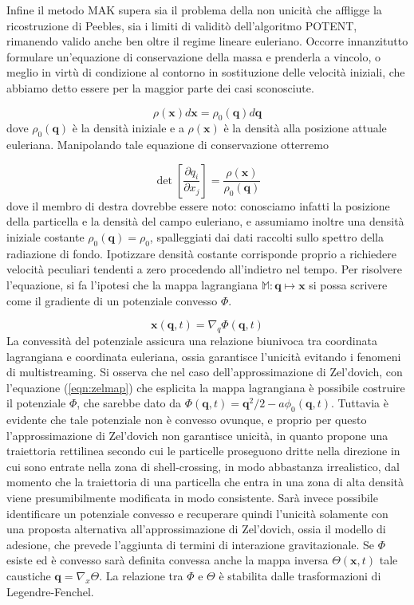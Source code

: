 Infine il metodo MAK supera sia il problema della non unicità che affligge la ricostruzione di Peebles, 
sia i limiti di validitò dell'algoritmo POTENT, rimanendo valido anche ben oltre il regime lineare euleriano.
Occorre innanzitutto formulare un'equazione di conservazione della massa e prenderla a vincolo, o meglio in virtù
di condizione al contorno in sostituzione delle velocità iniziali, che abbiamo detto essere per la maggior parte dei
casi sconosciute.

\begin{equation}
    \rho(\bm{x})d\bm{x} = \rho_0(\bm{q})d\bm{q}
\end{equation}
dove $\rho_0(\bm{q})$ è la densità iniziale e a $\rho(\bm{x})$ è la densità alla posizione attuale euleriana.
Manipolando tale equazione di conservazione otterremo 

\begin{equation}
    \label{eqn:masscons}
    \det\left[\frac{\partial q_i}{\partial x_j}\right] = \frac{\rho(\bm{x})}{\rho_0(\bm{q})}
\end{equation}
dove il membro di destra dovrebbe essere noto: conosciamo infatti la posizione della particella
e la densità del campo euleriano, e assumiamo inoltre una densità iniziale costante $\rho_0(\bm{q}) = \rho_0$,
spalleggiati dai dati raccolti sullo spettro della radiazione di fondo. Ipotizzare densità costante corrisponde 
proprio a richiedere velocità peculiari tendenti a zero procedendo all'indietro nel tempo.
Per risolvere l'equazione, si fa l'ipotesi che la mappa lagrangiana $\mathbb{M}: \bm{q} \mapsto \bm{x}$ si 
possa scrivere come il gradiente di un potenziale convesso $\Phi$.

\begin{equation}
    \bm{x}(\bm{q}, t) = \nabla_q \Phi(\bm{q}, t)
\end{equation}
La convessità del potenziale assicura una relazione biunivoca tra coordinata lagrangiana e coordinata
euleriana, ossia garantisce l'unicità evitando i fenomeni di multistreaming.
Si osserva che nel caso dell'approssimazione di Zel'dovich, con l'equazione (\ref{eqn:zelmap}) che esplicita la 
mappa lagrangiana è possibile costruire il potenziale $\Phi$, che sarebbe dato da 
$\Phi(\bm{q}, t) = \bm{q}^2/2 -a\phi_0(\bm{q}, t)$.
Tuttavia è evidente che tale potenziale non è convesso ovunque, e proprio per questo l'approssimazione
di Zel'dovich non garantisce unicità, in quanto propone una traiettoria rettilinea secondo cui le particelle 
proseguono dritte nella direzione in cui sono entrate nella zona di shell-crossing, in modo abbastanza irrealistico,
dal momento che la traiettoria di una particella che entra in una zona di alta densità viene presumibilmente modificata in modo 
consistente. 
Sarà invece possibile identificare un potenziale convesso e recuperare quindi l'unicità solamente con una proposta 
alternativa all'approssimazione di Zel'dovich, ossia il modello di adesione, che prevede l'aggiunta di 
termini di interazione gravitazionale.
Se $\Phi$ esiste ed è convesso sarà definita convessa anche la mappa inversa $\Theta(\bm{x}, t)$ tale caustiche
$\bm{q} = \nabla_x \Theta$. La relazione tra $\Phi$ e $\Theta$ è stabilita dalle trasformazioni di
Legendre-Fenchel.

